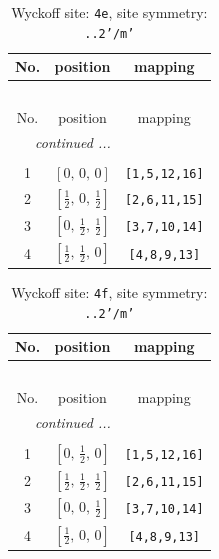 \documentclass[fleqn,8pt]{jsarticle}
\begin{document}
\renewcommand{\arraystretch}{1.2}
\begin{longtable}{ccc}
\caption{Wyckoff site: {\tt 4e}, site symmetry: {\tt ..2'/m'}}
 \\
 \hline \hline
No. & position & mapping \\ \hline \endfirsthead

\multicolumn{2}{l}{\tablename\ \thetable{}} \\
 \hline \hline
No. & position & mapping \\ \hline \endhead

 \hline \hline
\multicolumn{2}{r}{\footnotesize\it continued ...} \\ \endfoot

 \hline \hline
\multicolumn{2}{r}{} \\ \endlastfoot

1 & $\left[ 0,\, 0,\, 0 \right]$ & {\tt [1,5,12,16]} \\ \hline
2 & $\left[ \frac{1}{2},\, 0,\, \frac{1}{2} \right]$ & {\tt [2,6,11,15]} \\ \hline
3 & $\left[ 0,\, \frac{1}{2},\, \frac{1}{2} \right]$ & {\tt [3,7,10,14]} \\ \hline
4 & $\left[ \frac{1}{2},\, \frac{1}{2},\, 0 \right]$ & {\tt [4,8,9,13]} \\
\end{longtable}
\renewcommand{\arraystretch}{1.2}
\begin{longtable}{ccc}
\caption{Wyckoff site: {\tt 4f}, site symmetry: {\tt ..2'/m'}}
 \\
 \hline \hline
No. & position & mapping \\ \hline \endfirsthead

\multicolumn{2}{l}{\tablename\ \thetable{}} \\
 \hline \hline
No. & position & mapping \\ \hline \endhead

 \hline \hline
\multicolumn{2}{r}{\footnotesize\it continued ...} \\ \endfoot

 \hline \hline
\multicolumn{2}{r}{} \\ \endlastfoot

1 & $\left[ 0,\, \frac{1}{2},\, 0 \right]$ & {\tt [1,5,12,16]} \\ \hline
2 & $\left[ \frac{1}{2},\, \frac{1}{2},\, \frac{1}{2} \right]$ & {\tt [2,6,11,15]} \\ \hline
3 & $\left[ 0,\, 0,\, \frac{1}{2} \right]$ & {\tt [3,7,10,14]} \\ \hline
4 & $\left[ \frac{1}{2},\, 0,\, 0 \right]$ & {\tt [4,8,9,13]} \\
\end{longtable}
\end{document}
